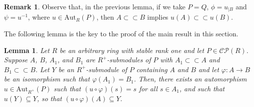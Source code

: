 \documentclass[11pt]{amsart}
\numberwithin{equation}{section}
\newtheorem{lma}{Lemma}[section]
\theoremstyle{definition}
\newtheorem{rmk}[rmkCt]{Remark}
\theoremstyle{plain}
\theoremstyle{definition}
\begin{document}
\begin{rmk} \label{auxiliar lemma cc}
Observe that, in the previous lemma, if we take $P = Q$, $\phi = u_{|B}$ and $\psi = u^{-1}$,  where $u \in \mathrm{Aut}_R(P)$, then $A \subset\!\subset B$ implies $u(A) \subset\!\subset u(B)$. 
\end{rmk}

The following lemma is the key to the proof of the main result in this section.

\begin{lma} \label{lema aprox}
Let $R$ be an arbitrary ring with stable rank one and let $P \in \mathcal{CP}(R)$. Suppose $A$, $B$, $A_1$, and $B_1$ are $R^+$-submodules of $P$ %
with $A_1 \subset\!\subset A$ and $B_1 \subset\!\subset B$. Let $Y$ be an $R^+$-submodule of $P$ containing $A$ and $B$ and let $\varphi \colon A \rightarrow B$ be an isomorphism such that $\varphi(A_1) = B_1$. Then, there exists an automorphism $u \in \mathrm{Aut}_{R^+}(P)$ such that $(u \circ \varphi)(s) = s$ for all $s \in A_1$, and such that $u(Y)\subseteq Y$, so that $(u \circ \varphi)(A) \subseteq Y$.  
\end{lma}
\end{document}
